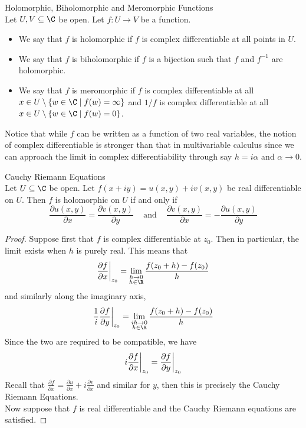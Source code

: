 \documentclass[a4paper]{article}
\begin{document}
\begin{defn}{Holomorphic, Biholomorphic and Meromorphic Functions}{}\\
Let $U,V\subseteq\C$ be open. Let $f:U\to V$ be a function. 
\begin{itemize}
\item We say that $f$ is holomorphic if $f$ is complex differentiable at all points in $U$. 
\item We say that $f$ is biholomorphic if $f$ is a bijection such that $f$ and $f^{-1}$ are holomorphic. 
\item We say that $f$ is meromorphic if $f$ is complex differentiable at all $x\in U\setminus\{w\in\C\;|\;f(w)=\infty\}$ and $1/f$ is complex differentiable at all $x\in U\setminus\{w\in\C\;|\;f(w)=0\}$. 
\end{itemize}
\end{defn}

Notice that while $f$ can be written as a function of two real variables, the notion of complex differentiable is stronger than that in multivariable calculus since we can approach the limit in complex differentiability through say $h=i\alpha$ and $\alpha\to 0$. 

\begin{thm}{Cauchy Riemann Equations}{}\\
Let $U\subseteq\C$ be open. Let $f(x+iy)=u(x,y)+iv(x,y)$ be real differentiable on $U$. Then $f$ is holomorphic on $U$ if and only if $$\frac{\partial u(x,y)}{\partial x}=\frac{\partial v(x,y)}{\partial y}\;\;\;\text{ and }\;\;\;\frac{\partial v(x,y)}{\partial x}=-\frac{\partial u(x,y)}{\partial y}$$
\begin{proof}
Suppose first that $f$ is complex differentiable at $z_0$. Then in particular, the limit exists when $h$ is purely real. This means that $$\frac{\partial f}{\partial x}\bigg{|}_{z_0}=\lim_{\substack{h\to 0\\h\in\R}}\frac{f(z_0+h)-f(z_0)}{h}$$ and similarly along the imaginary axis, $$\frac{1}{i}\frac{\partial f}{\partial y}\bigg{|}_{z_0}=\lim_{\substack{ih\to 0\\h\in\R}}\frac{f(z_0+h)-f(z_0)}{h}$$ Since the two are required to be compatible, we have $$i\frac{\partial f}{\partial x}\bigg{|}_{z_0}=\frac{\partial f}{\partial y}\bigg{|}_{z_0}$$ Recall that $\frac{\partial f}{\partial x}=\frac{\partial u}{\partial x}+i\frac{\partial v}{\partial x}$ and similar for $y$, then this is precisely the Cauchy Riemann Equations. \\
Now suppose that $f$ is real differentiable and the Cauchy Riemann equations are satisfied. 
\end{proof}
\end{thm}
\end{document}
